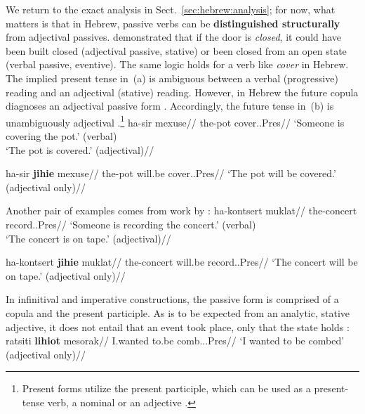 We return to the exact analysis in Sect.~\ref{sec:hebrew:analysis}; for now, what matters is that in Hebrew, passive verbs can be \textbf{distinguished structurally} from adjectival passives. \cite{embick04li} demonstrated that if the door is \emph{closed}, it could have been built closed (adjectival passive, stative) or been closed from an open state (verbal passive, eventive). The same logic holds for a verb like \emph{cover} in Hebrew. The implied present tense in~(\nextx a) is ambiguous between a verbal (progressive) reading and an adjectival (stative) reading. However, in Hebrew the future copula diagnoses an adjectival passive form \citep{doron00}. Accordingly, the future tense in~(\nextx b) is unambiguously adjectival \citep{doron00,horvathsiloni08,meltzerasscher11}.\footnote{Present forms utilize the present participle, which can be used as a present-tense verb, a nominal or an adjective \citep{boneh13tense,doron13ehll}.}
\pex \label{ex:pres-ambig}
    \a \begingl
        \gla{}ha-sir mexuse//
        \glb the-pot cover..Pres//
        \glft `Someone is covering the pot.' (verbal)\\`The pot is covered.' (adjectival)//
    \endgl
        
    \a \begingl
        \gla{}ha-sir \textbf{jihie} mexuse//
        \glb the-pot will.be cover..Pres//
        \glft `The pot will be covered.' (adjectival only)//
    \endgl
\xe

Another pair of examples comes from work by \cite{doron00}:
\pex \label{ex:pres-ambig2}
    \a \begingl
        \gla{}ha-kontsert muklat//
        \glb the-concert record..Pres//
        \glft `Someone is recording the concert.' (verbal)\\`The concert is on tape.' (adjectival)//
    \endgl
        
    \a \begingl
        \gla{}ha-kontsert \textbf{jihie} muklat//
        \glb the-concert will.be record..Pres//
        \glft `The concert will be on tape.' (adjectival only)//
    \endgl
\xe

In infinitival and imperative constructions, the passive form is comprised of a copula and the present participle. As is to be expected from an analytic, stative adjective, it does not entail that an event took place, only that the state holds \citep{doron00,kratzer00bls,embick04li}:
\pex \label{ex:analytic-pass}
    \a \begingl
        \gla{}ratsiti \textbf{lihiot} mesorak//
        \glb I.wanted to.be comb...Pres//
        \glft `I wanted to be combed' (adjectival only)//
    \endgl
    
